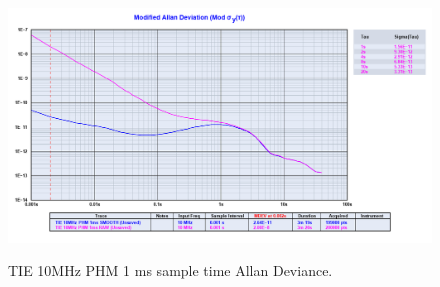 \documentclass[11pt,english,a4paper]{article}
\begin{document}
\begin{figure}[!htb]
  \caption{TIE 10MHz PHM 1 ms sample time Allan Deviance.}
  \centering
    \includegraphics[width=1\textwidth]{tie_10mhz_phm_1ms_modified_allan.png}
    \label{fig:PHM_10MHz_allan_dev}
\end{figure}
\end{document}
